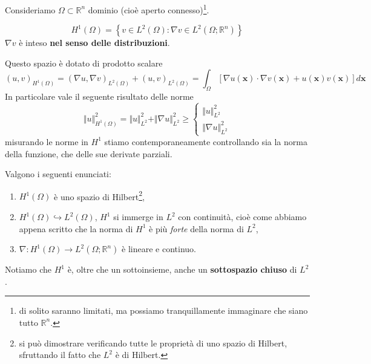 \documentclass[10pt,a4paper,twoside,openright]{book}
\newcommand{\x}{\mathbf{x}}
\begin{document}
Consideriamo $\Omega \subset \mathbb{R}^{n}$ dominio (cioè aperto connesso)\footnote{di solito saranno limitati, ma possiamo tranquillamente immaginare che siano tutto $\mathbb{R}^{n}$.}.
\begin{definition}
	\begin{equation*}
		H^{1}( \Omega ) =\left\{v\in L^{2}( \Omega ) :\nabla v\in L^{2}\left( \Omega ;\mathbb{R}^{n}\right)\right\}
	\end{equation*}
	$\nabla v$ è inteso \textbf{nel senso delle distribuzioni}.
\end{definition}
Questo spazio è dotato di prodotto scalare
\begin{equation*}
	( u,v)_{H^{1}( \Omega )} =( \nabla u,\nabla v)_{L^{2}( \Omega )} +( u,v)_{L^{2}( \Omega )} =\int _{\Omega }[ \nabla u(\x) \cdotp \nabla v(\x) +u(\x) v(\x)] d\x
\end{equation*}
In particolare vale il seguente risultato delle norme
\begin{equation*}
	\Vert u\Vert ^{2}_{H^{1}( \Omega )} =\Vert u\Vert ^{2}_{L^{2}} +\Vert \nabla u\Vert ^{2}_{L^{2}} \geqslant \begin{cases}
	\Vert u\Vert ^{2}_{L^{2}}\\
	\Vert \nabla u\Vert ^{2}_{L^{2}}
	\end{cases}
\end{equation*}
misurando le norme in $H^{1}$ stiamo contemporaneamente controllando sia la norma della funzione, che delle sue derivate parziali.
\begin{theorem}
	[Microteorema]
	Valgono i seguenti enunciati:
	\begin{enumerate}
		\item $H^{1}( \Omega )$ è uno spazio di Hilbert\footnote{si può dimostrare verificando tutte le proprietà di uno spazio di Hilbert, sfruttando il fatto che $L^{2}$ è di Hilbert.},
		\item $H^{1}( \Omega ) \hookrightarrow L^{2}( \Omega )$, $H^{1}$ si immerge in $L^{2}$ con continuità, cioè come abbiamo appena scritto che la norma di $H^{1}$ è più \textit{forte} della norma di $L^{2}$,
		\item $\nabla :H^{1}( \Omega )\rightarrow L^{2}\left( \Omega ;\mathbb{R}^{n}\right)$ è lineare e continuo.
	\end{enumerate}
\end{theorem}

Notiamo che $H^{1}$ è, oltre che un sottoinsieme, anche un \textbf{sottospazio chiuso} di $L^{2}$.
\end{document}
